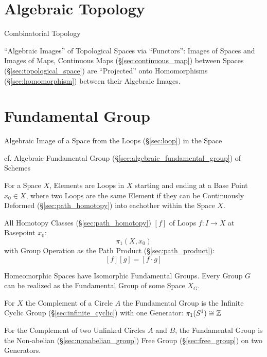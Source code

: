 \section{Algebraic Topology}\label{sec:algebraic_topology}

Combinatorial Topology

``Algebraic Images'' of Topological Spaces via ``Functors'': Images of
Spaces and Images of Maps, Continuous Maps
(\S\ref{sec:continuous_map}) between Spaces
(\S\ref{sec:topological_space}) are ``Projected'' onto Homomorphisms
(\S\ref{sec:homomorphism}) between their Algebraic
Images.\cite{hatcher02}



\section{Fundamental Group}\label{sec:fundamental_group}

Algebraic Image of a Space from the Loops (\S\ref{sec:loop}) in the
Space

cf. Algebraic Fundamental Group (\S\ref{sec:algebraic_fundamental_group}) of
Schemes

For a Space $X$, Elements are Loops in $X$ starting and ending at a
Base Point $x_0 \in X$, where two Loops are the same Element if they
can be Continuously Deformed (\S\ref{sec:path_homotopy}) into
eachother within the Space $X$.

All Homotopy Classes (\S\ref{sec:path_homotopy}) $[f]$ of Loops $f : I
\rightarrow X$ at Basepoint $x_0$:
\[
  \pi_1(X,x_0)
\]
with Group Operation as the Path Product (\S\ref{sec:path_product}):
\[
  [f][g] = [f \cdot g]
\]

Homeomorphic Spaces have Isomorphic Fundamental Groups. Every Group
$G$ can be realized as the Fundamental Group of some Space $X_G$.
\cite{hatcher02}

For $X$ the Complement of a Circle $A$ the Fundamental Group is the
Infinite Cyclic Group (\S\ref{sec:infinite_cyclic}) with one
Generator: $\pi_1(S^1) \cong \mathbb{Z}$

For the Complement of two Unlinked Circles $A$ and $B$, the
Fundamental Group is the Non-abelian (\S\ref{sec:nonabelian_group})
Free Group (\S\ref{sec:free_group}) on two Generators.

